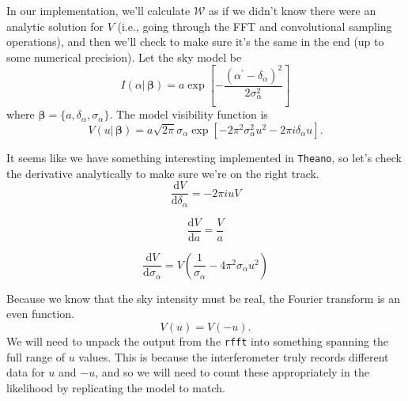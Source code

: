 \documentclass[modern]{aastex62}
\newcommand{\theano}{\texttt{Theano}}
\newcommand{\vm}{\boldsymbol{\mathcal{W}}} %
\newcommand{\bbeta}{\boldsymbol{\beta}} %
\begin{document}
In our implementation, we'll calculate $\vm$ as if we didn't know there were an analytic solution for $V$ (i.e., going through the FFT and convolutional sampling operations), and then we'll check to make sure it's the same in the end (up to some numerical precision). Let the sky model be
\begin{equation}
I(\alpha |\, \boldsymbol{\beta}) = a \exp \left [ -  \frac{(\alpha^\prime - \delta_\alpha)^2}{2 \sigma_\alpha^2} \right ]
\end{equation}
where $\bbeta = \{a, \delta_\alpha, \sigma_\alpha\}$. The model visibility function is 
\begin{equation}
V(u |\, \boldsymbol{\beta}) = a \sqrt{2 \pi} \sigma_\alpha \exp \left [ -2 \pi^2 \sigma_\alpha^2 u^2 - 2 \pi i \delta_\alpha u \right ].
\end{equation}

It seems like we have something interesting implemented in \theano, so let's check the derivative analytically to make sure we're on the right track. 
\begin{equation}
    \frac{\mathrm{d}V}{\mathrm{d}\delta_\alpha} = -2 \pi i u V
\end{equation}

\begin{equation}
    \frac{\mathrm{d}V}{\mathrm{d}a} = \frac{V}{a}
\end{equation}

\begin{equation}
    \frac{\mathrm{d}V}{\mathrm{d}\sigma_\alpha} = V \left ( \frac{1}{\sigma_\alpha} - 4 \pi^2 \sigma_\alpha u^2 \right)
\end{equation}

Because we know that the sky intensity must be real, the Fourier transform is an even function.
\begin{equation}
    V(u) = V(-u).
\end{equation}
We will need to unpack the output from the \texttt{rfft} into something spanning the full range of $u$ values. This is because the interferometer truly records different data for $u$ and $-u$, and so we will need to count these appropriately in the likelihood by replicating the model to match.
\end{document}
